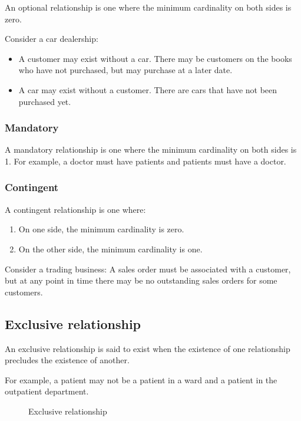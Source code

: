 An optional relationship is one where the minimum cardinality on both
sides is zero.

Consider a car dealership:

\begin{itemize}
\item
  A customer may exist without a car. There may be customers on the
  books who have not purchased, but may purchase at a later date.
\item
  A car may exist without a customer. There are cars that have not been
  purchased yet.
\end{itemize}

\subsubsection{Mandatory}\label{mandatory}

A mandatory relationship is one where the minimum cardinality on both
sides is 1. For example, a doctor must have patients and patients must
have a doctor.

\subsubsection{Contingent}\label{contingent}

A contingent relationship is one where:

\begin{enumerate}
\def\labelenumi{\arabic{enumi}.}
\item
  On one side, the minimum cardinality is zero.
\item
  On the other side, the minimum cardinality is one.
\end{enumerate}

Consider a trading business: A sales order must be associated with a
customer, but at any point in time there may be no outstanding sales
orders for some customers.

\subsection{Exclusive relationship}\label{exclusive-relationship}

An exclusive relationship is said to exist when the existence of one
relationship precludes the existence of another.

For example, a patient may not be a patient in a ward and a patient in
the outpatient department.

\begin{figure}[htbp]
  \centering
  \caption{Exclusive relationship{}}
\end{figure}

